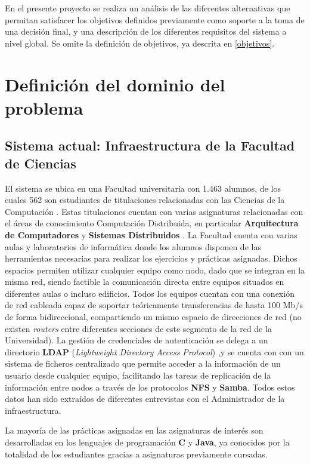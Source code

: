 En el presente proyecto se realiza un análisis de las diferentes alternativas que permitan satisfacer los objetivos definidos previamente como soporte a la toma de una decisión final, y una descripción de los diferentes requisitos del sistema a nivel global. Se omite la definición de objetivos, ya descrita en \ref{objetivos}.

\section{Definición del dominio del problema}

\subsection{Sistema actual: Infraestructura de la Facultad de Ciencias}
\label{dominioproblema:infraestructura}
El sistema se ubica en una Facultad universitaria con 1.463 alumnos, de los cuales 562 son estudiantes de titulaciones relacionadas con las Ciencias de la Computación \cite{uecusal:estudiantes}. Estas titulaciones cuentan con varias asignaturas relacionadas con el áreas de conocimiento Computación Distribuida, en particular \textbf{Arquitectura de Computadores} y \textbf{Sistemas Distribuidos} \cite{DIA15GuiaAcademica}. La Facultad cuenta con varias aulas y laboratorios de informática donde los alumnos disponen de las herramientas necesarias para realizar los ejercicios y prácticas asignadas. Dichos espacios permiten utilizar cualquier equipo como nodo, dado que se integran en la misma red, siendo factible la comunicación directa entre equipos situados en diferentes aulas o incluso edificios. Todos los equipos cuentan con una conexión de red cableada capaz de soportar teóricamente transferencias de hasta 100 Mb/s de forma bidireccional, compartiendo un mismo espacio de direcciones de red (no existen \textit{routers} entre diferentes secciones de este segmento de la red de la Universidad). La gestión de credenciales de autenticación se delega a un directorio \textbf{LDAP} (\textit{Lightweight Directory Access Protocol}) \cite{RFC4516-comment},y se cuenta con con un sistema de ficheros centralizado que permite acceder a la información de un usuario desde cualquier equipo, facilitando las tareas de replicación de la información entre nodos a través de los protocolos \textbf{NFS} y \textbf{Samba}. Todos estos datos han sido extraídos de diferentes entrevistas con el Administrador de la infraestructura.

La mayoría de las prácticas asignadas en las asignaturas de interés son desarrolladas en los lenguajes de programación \textbf{C} y \textbf{Java}, ya conocidos por la totalidad de los estudiantes gracias a asignaturas previamente cursadas.

